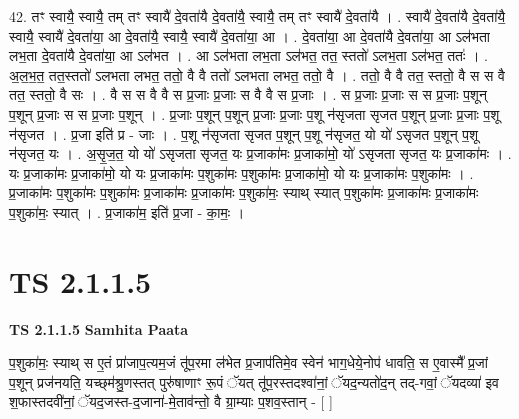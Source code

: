 \documentclass[17pt]{extarticle}
\begin{document}
42. तꣳ स्वायै॒ स्वायै॒ तम् तꣳ स्वायै॑ दे॒वता॑यै दे॒वता॑यै॒ स्वायै॒ तम् तꣳ स्वायै॑ दे॒वता॑यै । . स्वायै॑ दे॒वता॑यै दे॒वता॑यै॒ स्वायै॒ स्वायै॑ दे॒वता॑या॒ आ दे॒वता॑यै॒ स्वायै॒ स्वायै॑ दे॒वता॑या॒ आ । . दे॒वता॑या॒ आ दे॒वता॑यै दे॒वता॑या॒ आ ऽल॑भता लभ॒ता दे॒वता॑यै दे॒वता॑या॒ आ ऽल॑भत । . आ ऽल॑भता लभ॒ता ऽल॑भत॒ तत॒ स्ततो॑ ऽलभ॒ता ऽल॑भत॒ ततः॑ । . अ॒ल॒भ॒त॒ तत॒स्ततो॑ ऽलभता लभत॒ ततो॒ वै वै ततो॑ ऽलभता लभत॒ ततो॒ वै । . ततो॒ वै वै तत॒ स्ततो॒ वै स स वै तत॒ स्ततो॒ वै सः । . वै स स वै वै स प्र॒जाः प्र॒जाः स वै वै स प्र॒जाः । . स प्र॒जाः प्र॒जाः स स प्र॒जाः प॒शून् प॒शून् प्र॒जाः स स प्र॒जाः प॒शून् । . प्र॒जाः प॒शून् प॒शून् प्र॒जाः प्र॒जाः प॒शू न॑सृजता सृजत प॒शून् प्र॒जाः प्र॒जाः प॒शू न॑सृजत । . प्र॒जा इति॑ प्र - जाः । . प॒शू न॑सृजता सृजत प॒शून् प॒शू न॑सृजत॒ यो यो॑ ऽसृजत प॒शून् प॒शू न॑सृजत॒ यः । . अ॒सृ॒ज॒त॒ यो यो॑ ऽसृजता सृजत॒ यः प्र॒जाका॑मः प्र॒जाका॑मो॒ यो॑ ऽसृजता सृजत॒ यः प्र॒जाका॑मः । . यः प्र॒जाका॑मः प्र॒जाका॑मो॒ यो यः प्र॒जाका॑मः प॒शुका॑मः प॒शुका॑मः प्र॒जाका॑मो॒ यो यः प्र॒जाका॑मः प॒शुका॑मः । . प्र॒जाका॑मः प॒शुका॑मः प॒शुका॑मः प्र॒जाका॑मः प्र॒जाका॑मः प॒शुका॑मः॒ स्याथ् स्यात् प॒शुका॑मः प्र॒जाका॑मः प्र॒जाका॑मः प॒शुका॑मः॒ स्यात् । . प्र॒जाका॑म॒ इति॑ प्र॒जा - का॒मः॒ । \newline
\pagebreak
{}
\section*{ TS 2.1.1.5 }

\textbf{TS 2.1.1.5 } \newline
\textbf{Samhita Paata} \newline

प॒शुका॑मः॒ स्याथ् स ए॒तं प्रा॑जाप॒त्यम॒जं तू॑प॒रमा ल॑भेत प्र॒जाप॑तिमे॒व स्वेन॑ भाग॒धेये॒नोप॑ धावति॒ स ए॒वास्मै᳚ प्र॒जां प॒शून् प्रज॑नयति॒ यच्छ्‌म॑श्रु॒णस्तत् पुरु॑षाणाꣳ रू॒पं ॅयत् तू॑प॒रस्तदश्वा॑नां॒ ॅयद॒न्यतो॑द॒न् तद्-गवां॒ ॅयदव्या॑ इव श॒फास्तदवी॑नां॒ ॅयद॒जस्त-द॒जाना॑-मे॒ताव॑न्तो॒ वै ग्रा॒म्याः प॒शव॒स्तान् - [  ] \newline
\end{document}
